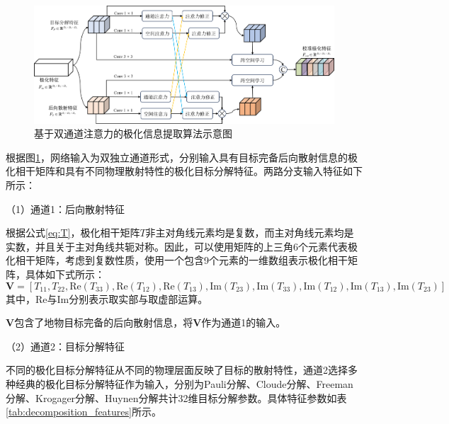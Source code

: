 \begin{figure}[h]
  \centering
  \includegraphics[width=14cm]{pic/chapter3/DPEN_framework.png}
  \caption{基于双通道注意力的极化信息提取算法示意图}
  \label{DPEN_framework}
\end{figure}

根据图\ref{DPEN_framework}，网络输入为双独立通道形式，分别输入具有目标完备后向散射信息的极化相干矩阵和具有不同物理散射特性的极化目标分解特征。两路分支输入特征如下所示：

（1）通道1：后向散射特征

根据公式\ref{eq:T}，极化相干矩阵$T$非主对角线元素均是复数，而主对角线元素均是实数，并且关于主对角线共轭对称。因此，可以使用矩阵的上三角6个元素代表极化相干矩阵，考虑到复数性质，使用一个包含9个元素的一维数组表示极化相干矩阵，具体如下式所示：
\begin{equation}
  \mathbf{V}=[T_{11}, T_{22}, \text{Re}(T_{33}), \text{Re}(T_{12}), \text{Re}(T_{13}), \text{Im}(T_{23}), \text{Im}(T_{33}), \text{Im}(T_{12}), \text{Im}(T_{13}), \text{Im}(T_{23})]
\end{equation}
其中，$\text{Re}$与$\text{Im}$分别表示取实部与取虚部运算。

$\mathbf{V}$包含了地物目标完备的后向散射信息，将$\mathbf{V}$作为通道1的输入。

（2）通道2：目标分解特征

不同的极化目标分解特征从不同的物理层面反映了目标的散射特性，通道2选择多种经典的极化目标分解特征作为输入，分别为Pauli分解、Cloude分解、Freeman分解、Krogager分解、Huynen分解共计32维目标分解参数。具体特征参数如表\ref{tab:decomposition_features}所示。

